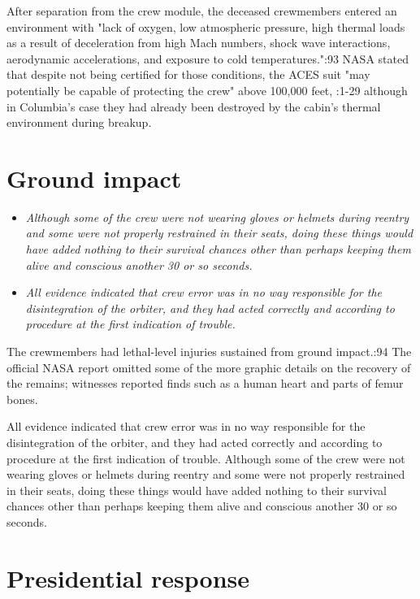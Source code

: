 After separation from the crew module, the deceased crewmembers entered
an environment with "lack of oxygen, low atmospheric pressure, high
thermal loads as a result of deceleration from high Mach numbers, shock
wave interactions, aerodynamic accelerations, and exposure to cold
temperatures.":93 NASA stated that despite not being certified for those
conditions, the ACES suit "may potentially be capable of protecting the
crew" above 100,000 feet, :1-29 although in Columbia's case they had
already been destroyed by the cabin's thermal environment during
breakup.

\section{Ground impact}\label{ground-impact}

\begin{itemize}
\item
  \emph{Although some of the crew were not wearing gloves or helmets
  during reentry and some were not properly restrained in their seats,
  doing these things would have added nothing to their survival chances
  other than perhaps keeping them alive and conscious another 30 or so
  seconds.}
\item
  \emph{All evidence indicated that crew error was in no way responsible
  for the disintegration of the orbiter, and they had acted correctly
  and according to procedure at the first indication of trouble.}
\end{itemize}

The crewmembers had lethal-level injuries sustained from ground
impact.:94 The official NASA report omitted some of the more graphic
details on the recovery of the remains; witnesses reported finds such as
a human heart and parts of femur bones.

All evidence indicated that crew error was in no way responsible for the
disintegration of the orbiter, and they had acted correctly and
according to procedure at the first indication of trouble. Although some
of the crew were not wearing gloves or helmets during reentry and some
were not properly restrained in their seats, doing these things would
have added nothing to their survival chances other than perhaps keeping
them alive and conscious another 30 or so seconds.

\section{Presidential response}\label{presidential-response}

